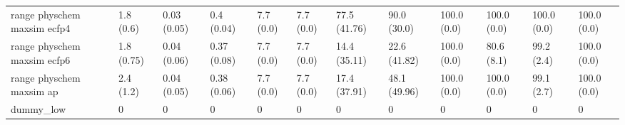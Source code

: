 \begin{tabular}{llllllllllll}
range physchem maxsim ecfp4 & {\cellcolor[HTML]{F5FBFC}} \color[HTML]{000000} 1.8 (0.6) & {\cellcolor[HTML]{F7FCFD}} \color[HTML]{000000} 0.03 (0.05) & {\cellcolor[HTML]{6CC4A8}} \color[HTML]{000000} 0.4 (0.04) & {\cellcolor[HTML]{F7FCFD}} \color[HTML]{000000} 7.7 (0.0) & {\cellcolor[HTML]{F7FCFD}} \color[HTML]{000000} 7.7 (0.0) & {\cellcolor[HTML]{1C8540}} \color[HTML]{F1F1F1} 77.5 (41.76) & {\cellcolor[HTML]{006428}} \color[HTML]{F1F1F1} 90.0 (30.0) & {\cellcolor[HTML]{00441B}} \color[HTML]{F1F1F1} 100.0 (0.0) & {\cellcolor[HTML]{00441B}} \color[HTML]{F1F1F1} 100.0 (0.0) & {\cellcolor[HTML]{00471C}} \color[HTML]{F1F1F1} 100.0 (0.0) & {\cellcolor[HTML]{00441B}} \color[HTML]{F1F1F1} 100.0 (0.0) \\
range physchem maxsim ecfp6 & {\cellcolor[HTML]{F5FBFC}} \color[HTML]{000000} 1.8 (0.75) & {\cellcolor[HTML]{F7FCFD}} \color[HTML]{000000} 0.04 (0.06) & {\cellcolor[HTML]{84CFB9}} \color[HTML]{000000} 0.37 (0.08) & {\cellcolor[HTML]{F7FCFD}} \color[HTML]{000000} 7.7 (0.0) & {\cellcolor[HTML]{F7FCFD}} \color[HTML]{000000} 7.7 (0.0) & {\cellcolor[HTML]{E2F4F7}} \color[HTML]{000000} 14.4 (35.11) & {\cellcolor[HTML]{D1EEEA}} \color[HTML]{000000} 22.6 (41.82) & {\cellcolor[HTML]{00441B}} \color[HTML]{F1F1F1} 100.0 (0.0) & {\cellcolor[HTML]{00441B}} \color[HTML]{F1F1F1} 80.6 (8.1) & {\cellcolor[HTML]{00441B}} \color[HTML]{F1F1F1} 99.2 (2.4) & {\cellcolor[HTML]{00441B}} \color[HTML]{F1F1F1} 100.0 (0.0) \\
range physchem maxsim ap & {\cellcolor[HTML]{F4FBFC}} \color[HTML]{000000} 2.4 (1.2) & {\cellcolor[HTML]{F7FCFD}} \color[HTML]{000000} 0.04 (0.05) & {\cellcolor[HTML]{74C8AE}} \color[HTML]{000000} 0.38 (0.06) & {\cellcolor[HTML]{ECF8FB}} \color[HTML]{000000} 7.7 (0.0) & {\cellcolor[HTML]{ECF8FB}} \color[HTML]{000000} 7.7 (0.0) & {\cellcolor[HTML]{DBF2F2}} \color[HTML]{000000} 17.4 (37.91) & {\cellcolor[HTML]{6DC5A9}} \color[HTML]{000000} 48.1 (49.96) & {\cellcolor[HTML]{00441B}} \color[HTML]{F1F1F1} 100.0 (0.0) & {\cellcolor[HTML]{00441B}} \color[HTML]{F1F1F1} 100.0 (0.0) & {\cellcolor[HTML]{00441B}} \color[HTML]{F1F1F1} 99.1 (2.7) & {\cellcolor[HTML]{00441B}} \color[HTML]{F1F1F1} 100.0 (0.0) \\
dummy_low & {\cellcolor[HTML]{F7FCFD}} \color[HTML]{000000} 0 & {\cellcolor[HTML]{F7FCFD}} \color[HTML]{000000} 0 & {\cellcolor[HTML]{F7FCFD}} \color[HTML]{000000} 0 & {\cellcolor[HTML]{F7FCFD}} \color[HTML]{000000} 0 & {\cellcolor[HTML]{F7FCFD}} \color[HTML]{000000} 0 & {\cellcolor[HTML]{F7FCFD}} \color[HTML]{000000} 0 & {\cellcolor[HTML]{F7FCFD}} \color[HTML]{000000} 0 & {\cellcolor[HTML]{F7FCFD}} \color[HTML]{000000} 0 & {\cellcolor[HTML]{F7FCFD}} \color[HTML]{000000} 0 & {\cellcolor[HTML]{F7FCFD}} \color[HTML]{000000} 0 & {\cellcolor[HTML]{F7FCFD}} \color[HTML]{000000} 0 \\

\end{tabular}
